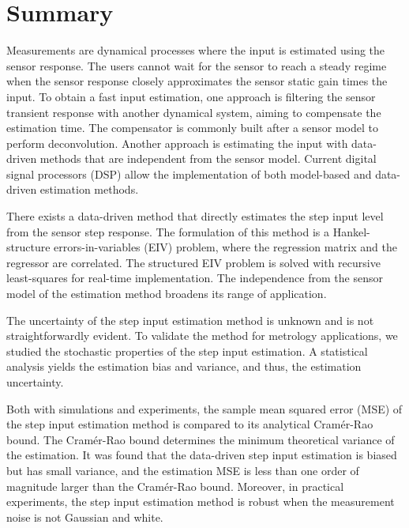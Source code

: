 \chapter{Summary} \label{chap:Summary}
\vspace{-1.5cm}
Measurements are dynamical processes where the input is estimated using the sensor response. 
The users cannot wait for the sensor to reach a steady regime when the sensor response closely approximates the sensor static gain times the input. 
To obtain a fast input estimation, one approach is filtering the sensor transient response with another dynamical system, aiming to compensate the estimation time.
The compensator is commonly built after a sensor model to perform deconvolution.  
Another approach is estimating the input with data-driven methods that are independent from the sensor model.
Current digital signal processors (DSP) allow the implementation of both model-based and data-driven estimation methods.

There exists a data-driven method that directly estimates the step input level from the sensor step response. 
The formulation of this method is a Hankel-structure errors-in-variables (EIV) problem, where the regression matrix and the regressor are correlated.
The structured EIV problem is solved with recursive least-squares for real-time implementation.
The independence from the sensor model of the estimation method broadens its range of application.

The uncertainty of the step input estimation method is unknown and is not straightforwardly evident.
To validate the method for metrology applications, we studied the stochastic properties of the step input estimation.
A statistical analysis yields the estimation bias and variance, and thus, the estimation uncertainty.

Both with simulations and experiments, the sample mean squared error (MSE) of the step input estimation method is compared to its analytical Cram\'er-Rao bound.
The Cram\'er-Rao bound determines the minimum theoretical variance of the estimation.
It was found that the data-driven step input estimation is biased but has small variance, and the estimation MSE is less than one order of magnitude larger than the Cram\'er-Rao bound.
Moreover, in practical experiments, the step input estimation method is robust when the measurement noise is not Gaussian and white.

